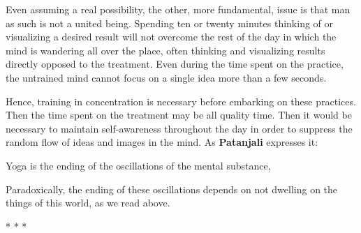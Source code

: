 Even assuming a real possibility, the other, more fundamental, issue is that man as such is not a united being. Spending ten or twenty minutes thinking of or visualizing a desired result will not overcome the rest of the day in which the mind is wandering all over the place, often thinking and visualizing results directly opposed to the treatment. Even during the time spent on the practice, the untrained mind cannot focus on a single idea more than a few seconds.

Hence, training in concentration is necessary before embarking on these practices. Then the time spent on the treatment may be all quality time. Then it would be necessary to maintain self-awareness throughout the day in order to suppress the random flow of ideas and images in the mind. As \textbf{Patanjali} expresses it:

\begin{quotex}
Yoga is the ending of the oscillations of the mental substance, 

\end{quotex}
Paradoxically, the ending of these oscillations depends on not dwelling on the things of this world, as we read above.




\begin{center}* * *\end{center}

